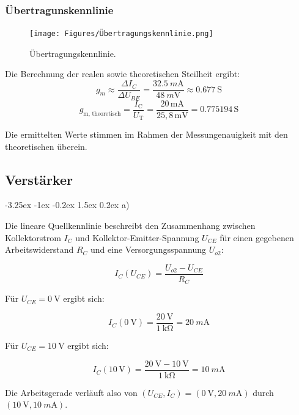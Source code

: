 \documentclass[
	a4paper, %
	12pt, %
]{CSUniSchoolLabReport}
\makeatletter
\renewcommand\paragraph{\@startsection{paragraph}{4}{\z@}%
  {-3.25ex \@plus -1ex \@minus -0.2ex}%
  {1.5ex \@plus 0.2ex}%
  {\normalfont\normalsize\bfseries}}
\newcommand{\milli}{m}
\makeatother
\begin{document}
\subsubsection{Übertragunskennlinie}
\begin{figure}[H]
	\centering
	\texttt{[image: Figures/Übertragungskennlinie.png]}
	\caption{Übertragungskennlinie.}
	\label{fig:Übertragungskennlinie}
\end{figure}

Die Berechnung der realen sowie theoretischen Steilheit ergibt:\\

\[
g_m \approx \frac{\Delta I_C}{\Delta U_{BE}} = \frac{\SI{32.5}{\milli\ampere}}{\SI{48}{\milli\volt}} \approx \SI{0.677}{\siemens}
\]
\[
g_{\text{m, theoretisch}} = \frac{I_{\text{C}}}{U_{\text{T}}} = \frac{20\,\text{mA}}{25,8\,\text{mV}} = 0.775194\,\text{S}
\]

\vspace{2em}
Die ermittelten Werte stimmen im Rahmen der Messungenauigkeit mit den theoretischen überein.

\subsection{Verstärker}
\paragraph{a)}

Die lineare Quellkennlinie beschreibt den Zusammenhang zwischen Kollektorstrom $I_C$ und Kollektor-Emitter-Spannung $U_{CE}$ für einen gegebenen Arbeitswiderstand $R_C$ und eine Versorgungsspannung $U_{o2}$:

\[
I_C(U_{CE}) = \frac{U_{o2} - U_{CE}}{R_C}
\]

Für $U_{CE} = \SI{0}{\volt}$ ergibt sich:

\[
I_C(\SI{0}{\volt}) = \frac{\SI{20}{\volt}}{\SI{1}{\kilo\ohm}} = \SI{20}{\milli\ampere}
\]

Für $U_{CE} = \SI{10}{\volt}$ ergibt sich:

\[
I_C(10\,\mathrm{V}) = \frac{\SI{20}{\volt}- \SI{10}{\volt}}{\SI{1}{\kilo\ohm}} = \SI{10}{\milli\ampere}
\]

\vspace{1em}
Die Arbeitsgerade verläuft also von $(U_{CE}, I_C) = (\SI{0}{\volt}, \SI{20}{\milli\ampere})$ durch $(\SI{10}{\volt}, \SI{10}{\milli\ampere})$.
\end{document}
